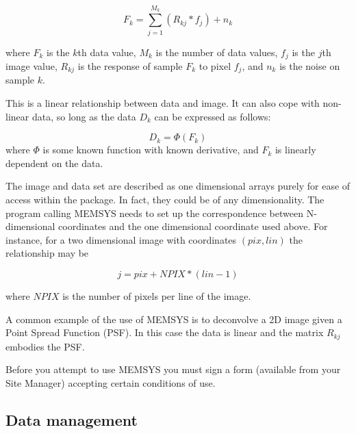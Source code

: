 \begin{description}
\begin {equation}
F_{k}=\sum_{j=1}^{M_{k}} (R_{kj}*f_{j})+n_{k}  \label {EQ:DATA}
\end {equation}

where $F_{k}$ is the $k$th data value, $M_{k}$ is the number of data values,
$f_{j}$ is the $j$th image value, $R_{kj}$ is the response of sample $F_{k}$ to
pixel $f_{j}$, and $n_{k}$ is the noise on sample $k$. 

This is a linear relationship between data and image.
It can also cope with non-linear data, so long as the data $D_{k}$ can be
expressed as follows:

\begin {equation}
D_{k} = \Phi(F_{k})
\end {equation}
 where $\Phi$ is some known function with known derivative, and $F_{k}$ is 
linearly dependent on the data. 

The image and data set are described as one dimensional arrays purely for ease 
of access within the package.
In fact, they could be of any dimensionality.
The program calling MEMSYS needs to set up the correspondence between
N-dimensional coordinates and the one dimensional coordinate used above.
For instance, for a two dimensional image with coordinates $(pix,lin)$ the
relationship may be

\begin {equation}
 j = pix + NPIX*(lin-1)
\end {equation}

where $NPIX$ is the number of pixels per line of the image.

A common example of the use of MEMSYS is to deconvolve a 2D image given a
Point Spread Function (PSF).
In this case the data is linear and the matrix $R_{kj}$ embodies the PSF.

Before you attempt to use MEMSYS you must sign a form (available from your
Site Manager) accepting certain conditions of use.

\end{description}

\newpage

\subsection{Data management}
\label{datman}

